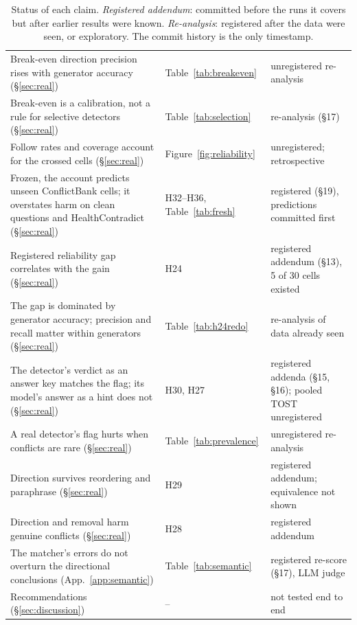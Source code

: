 \begin{table}[t]
\begin{tabular}{p{7.4cm}p{3.6cm}p{4.2cm}}
Break-even direction precision rises with generator accuracy (\S\ref{sec:real}) & Table~\ref{tab:breakeven} & unregistered re-analysis \\
Break-even is a calibration, not a rule for selective detectors (\S\ref{sec:real}) & Table~\ref{tab:selection} & re-analysis (\S17) \\
Follow rates and coverage account for the crossed cells (\S\ref{sec:real}) & Figure~\ref{fig:reliability} & unregistered; retrospective \\
Frozen, the account predicts unseen ConflictBank cells; it overstates harm on clean questions and HealthContradict (\S\ref{sec:real}) & H32--H36, Table~\ref{tab:fresh} & registered (\S19), predictions committed first \\
Registered reliability gap correlates with the gain (\S\ref{sec:real}) & H24 & registered addendum (\S13), 5 of 30 cells existed \\
The gap is dominated by generator accuracy; precision and recall matter within generators (\S\ref{sec:real}) & Table~\ref{tab:h24redo} & re-analysis of data already seen \\
The detector's verdict as an answer key matches the flag; its model's answer as a hint does not (\S\ref{sec:real}) & H30, H27 & registered addenda (\S15, \S16); pooled TOST unregistered \\
A real detector's flag hurts when conflicts are rare (\S\ref{sec:real}) & Table~\ref{tab:prevalence} & unregistered re-analysis \\
Direction survives reordering and paraphrase (\S\ref{sec:real}) & H29 & registered addendum; equivalence not shown \\
Direction and removal harm genuine conflicts (\S\ref{sec:real}) & H28 & registered addendum \\
The matcher's errors do not overturn the directional conclusions (App.~\ref{app:semantic}) & Table~\ref{tab:semantic} & registered re-score (\S17), LLM judge \\
Recommendations (\S\ref{sec:discussion}) & -- & not tested end to end \\
\bottomrule
\end{tabular}
\caption{Status of each claim. \emph{Registered addendum}: committed before the runs it covers but
after earlier results were known. \emph{Re-analysis}: registered after the data were seen, or exploratory. The commit
history is the only timestamp.}
\label{tab:claims}
\end{table}

